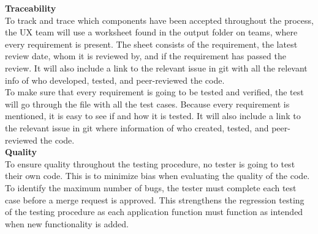 \noindent\textbf{Traceability}\\
To track and trace which components have been accepted throughout the process, the UX team will use a worksheet found in the output folder on teams, where every requirement is present. The sheet consists of the requirement, the latest review date, whom it is reviewed by, and if the requirement has passed the review. It will also include a link to the relevant issue in git with all the relevant info of who developed, tested, and peer-reviewed the code.\\

\noindent To make sure that every requirement is going to be tested and verified, the test will go through the file with all the test cases. Because every requirement is mentioned, it is easy to see if and how it is tested. It will also include a link to the relevant issue in git where information of who created, tested, and peer-reviewed the code.\\  

\noindent\textbf{Quality}\\
To ensure quality throughout the testing procedure, no tester is going to test their own code. This is to minimize bias when evaluating the quality of the code. To identify the maximum number of bugs, the tester must complete each test case before a merge request is approved. This strengthens the regression testing of the testing procedure as each application function must function as intended when new functionality is added. \\

